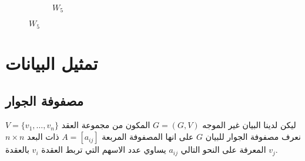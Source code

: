 \begin{english}
\begin{figure}[H]
\begin{subfigure}{0.3\textwidth}
 		\caption{$W_5$}
 	\end{subfigure}
 \end{figure}
 \end{english}
 
 \section{تمثيل البيانات }
 
 \subsection{مصفوفة الجوار }
 ليكن لدينا البيان غير الموجه $G= (G, V)$ المكون من مجموعة العقد 
 $V = \{v_1, \dots, v_n\}$
نعرف مصفوفة الجوار للبيان $G$ على انها المصفوفة المربعة $A = [a_{ij}]$ ذات البعد $n\times n$ المعرفة على النحو التالي
$a_{ij}$ يساوي عدد الاسهم التي تربط العقدة $v_i$ بالعقدة $v_j$.
 
